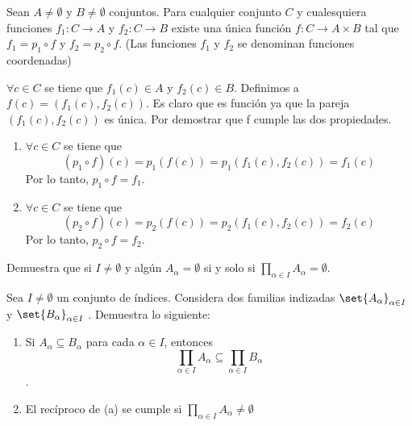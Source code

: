 \documentclass[fc]{tarea}
\begin{document}
\begin{exercise}
   Sean $A \neq \emptyset$ y $B \neq \emptyset$ conjuntos. Para cualquier conjunto $C$ y cualesquiera funciones
   $f_1: C \to A$ y $f_2 : C \to B$ existe una única función $f: C \to A \times B$ tal que $f_1 = p_1 \circ f$
   y $f_2 = p_2 \circ f$. (Las funciones $f_1$ y $f_2$ se denominan funciones coordenadas)
\end{exercise}

\begin{solution}
   $\forall c \in C$ se tiene que $f_1(c) \in A$ y $f_2(c) \in B$. Definimos a $f(c) = (f_1(c), f_2(c))$.
   Es claro que es función ya que la pareja $(f_1(c), f_2(c))$ es única. Por demostrar que f cumple las 
   dos propiedades.
   \begin{enumerate}
      \item $\forall c \in C$ se tiene que $$ (p_1 \circ f)(c) = p_1(f(c)) = p_1(f_1(c), f_2(c)) = f_1(c)$$
            Por lo tanto, $p_1 \circ f = f_1$.
      \item $\forall c \in C$ se tiene que $$ (p_2 \circ f)(c) = p_2(f(c)) = p_2(f_1(c), f_2(c)) = f_2(c)$$
            Por lo tanto, $p_2 \circ f = f_2$. 
   \end{enumerate}
\end{solution}

\begin{exercise}
   Demuestra que si $I\neq \emptyset$ y algún $A_\alpha = \emptyset$ si y solo si $\prod_{\alpha \in I} A_{\alpha} = \emptyset$.
\end{exercise}

\begin{exercise}
   Sea $I \neq \emptyset$ un conjunto de índices. Considera dos familias indizadas $\set{A_{\alpha}}_{\alpha \in I}$ 
   y $\set{B_{\alpha}}_{\alpha \in I}$ . Demuestra lo siguiente:
   \begin{enumerate}
      \item Si $A_{\alpha} \subseteq B_{\alpha}$ para cada $\alpha \in I$, entonces
         $$\prod_{\alpha \in I} A_{\alpha} \subseteq \prod_{\alpha \in I} B_{\alpha}$$.
      \item El recíproco de (a) se cumple si $\prod_{\alpha \in I} A_{\alpha} \neq \emptyset$
   \end{enumerate}
\end{exercise}
\end{document}
